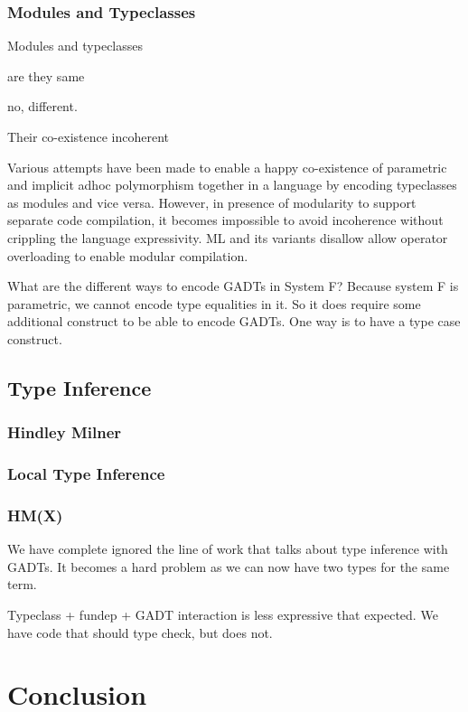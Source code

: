 \documentclass[manuscript,screen,nonacm]{acmart}
\begin{document}
\subsubsection{Modules and Typeclasses}
Modules and typeclasses

are they same

no, different.

Their co-existence incoherent

Various attempts\cite{dreyer_modular_2007, wehr_ml_2008, white_modular_2014} have been made to enable a happy co-existence of parametric and implicit adhoc polymorphism together in a language by encoding typeclasses as modules and vice versa. However, in presence of modularity to support separate code compilation, it becomes impossible to avoid incoherence without crippling the language expressivity. ML and its variants\cite{milner_definition_1997,leroy_ocaml_2023} disallow allow operator overloading to enable modular compilation.



What are the different ways to encode GADTs in System F?
Because system F is parametric, we cannot encode type equalities in it. So it does require some additional construct to be able to encode GADTs. One way is to have a type case construct.
\label{sec:related-work}

\subsection{Type Inference}
\subsubsection{Hindley Milner}
\subsubsection{Local Type Inference}
\subsubsection{HM(X)}
We have complete ignored the line of work that talks about type inference with GADTs. It becomes a hard problem as we can now have two types for the same term.

Typeclass + fundep + GADT interaction is less expressive that expected. We have code that should type check, but does not.

\section{Conclusion}\label{sec:conclusion}
\end{document}

